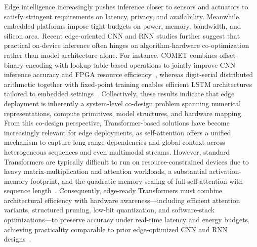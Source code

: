\documentclass[pdflatex,sn-mathphys-num]{sn-jnl}%
\theoremstyle{thmstyleone}
\theoremstyle{thmstyletwo}%
\theoremstyle{thmstylethree}%
\begin{document}
Edge intelligence increasingly pushes inference closer to sensors and actuators to satisfy stringent requirements on latency, privacy, and availability. Meanwhile, embedded platforms impose tight budgets on power, memory, bandwidth, and silicon area. Recent edge-oriented CNN and RNN studies further suggest that practical on-device inference often hinges on algorithm-hardware co-optimization rather than model architecture alone. For instance, COMET combines offset-binary encoding with lookup-table-based operations to jointly improve CNN inference accuracy and FPGA resource efficiency~\cite{chen2025comet}, whereas digit-serial distributed arithmetic together with fixed-point training enables efficient LSTM architectures tailored to embedded settings~\cite{khan2024digit,alhartomi2023low}. Collectively, these results indicate that edge deployment is inherently a system-level co-design problem spanning numerical representations, compute primitives, model structures, and hardware mapping.
From this co-design perspective, Transformer-based solutions have become increasingly relevant for edge deployments, as self-attention offers a unified mechanism to capture long-range dependencies and global context across heterogeneous sequences and even multimodal streams. However, standard Transformers are typically difficult to run on resource-constrained devices due to heavy matrix-multiplication and attention workloads, a substantial activation-memory footprint, and the quadratic memory scaling of full self-attention with sequence length~\cite{saha2025vit_edge}.
Consequently, edge-ready Transformers must combine architectural efficiency with hardware awareness---including efficient attention variants, structured pruning, low-bit quantization, and software-stack optimizations---to preserve accuracy under real-time latency and energy budgets, achieving practicality comparable to prior edge-optimized CNN and RNN designs~\cite{chen2025comet,khan2024digit,alhartomi2023low}.
\end{document}
